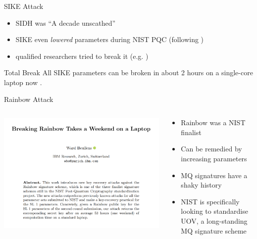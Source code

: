 \documentclass[xcolor=table,10pt,aspectratio=169]{beamer}
\begin{document}
\begin{frame}[label={sec:org4082e51}]{SIKE Attack}

\begin{itemize}
\item SIDH was “A decade unscathed” \cite{EPRINT:Costello21}
\item SIKE even \emph{lowered} parameters during NIST PQC (following \cite{C:JaqSch19})
\item qualified researchers tried to break it (e.g. \cite{EPRINT:MarPan19})
\end{itemize}

\begin{alertblock}{Total Break}
All SIKE parameters can be broken in about 2 hours on a single-core laptop now \cite{EPRINT:OudPop22}.
\end{alertblock}
\end{frame}
\begin{frame}[label={sec:org9d5ca36}]{Rainbow Attack}
\begin{columns}[t]
\begin{column}{0.6\columnwidth}
\begin{center}
\includegraphics[keepaspectratio,height=.8\textheight]{./breaking-rainbow.png}
\end{center}
\end{column}

\begin{column}{0.4\columnwidth}
\begin{itemize}
\item Rainbow was a NIST finalist \cite{EPRINT:Beullens22}
\item Can be remedied by increasing parameters
\item MQ signatures have a shaky history
\item NIST is specifically looking to standardise UOV, a long-standing MQ signature scheme
\end{itemize}
\end{column}
\end{columns}
\end{frame}
\end{document}
